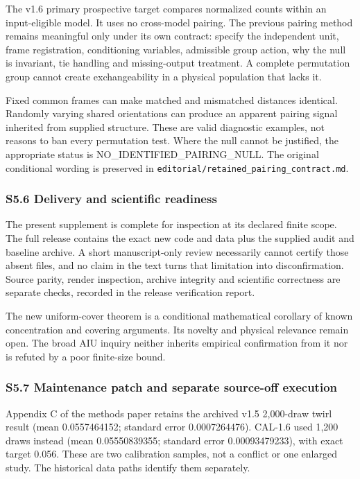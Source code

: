 \documentclass[
  10pt,
  a4paper,
]{article}
\begin{document}
The v1.6 primary prospective target compares normalized counts within an
input-eligible model. It uses no cross-model pairing. The previous
pairing method remains meaningful only under its own contract: specify
the independent unit, frame registration, conditioning variables,
admissible group action, why the null is invariant, tie handling and
missing-output treatment. A complete permutation group cannot create
exchangeability in a physical population that lacks it.

Fixed common frames can make matched and mismatched distances identical.
Randomly varying shared orientations can produce an apparent pairing
signal inherited from supplied structure. These are valid diagnostic
examples, not reasons to ban every permutation test. Where the null
cannot be justified, the appropriate status is
NO\_IDENTIFIED\_PAIRING\_NULL. The original conditional wording is
preserved in \nolinkurl{editorial/retained_pairing_contract.md}.

\subsubsection{S5.6 Delivery and scientific
readiness}\label{s5.6-delivery-and-scientific-readiness}

The present supplement is complete for inspection at its declared finite
scope. The full release contains the exact new code and data plus the
supplied audit and baseline archive. A short manuscript-only review
necessarily cannot certify those absent files, and no claim in the text
turns that limitation into disconfirmation. Source parity, render
inspection, archive integrity and scientific correctness are separate
checks, recorded in the release verification report.

The new uniform-cover theorem is a conditional mathematical corollary of
known concentration and covering arguments. Its novelty and physical
relevance remain open. The broad AIU inquiry neither inherits empirical
confirmation from it nor is refuted by a poor finite-size bound.

\subsubsection{S5.7 Maintenance patch and separate source-off
execution}\label{s5.7-maintenance-patch-and-separate-source-off-execution}

Appendix C of the methods paper retains the archived v1.5 2,000-draw
twirl result (mean 0.0557464152; standard error 0.0007264476). CAL-1.6
used 1,200 draws instead (mean 0.05550839355; standard error
0.00093479233), with exact target 0.056. These are two calibration
samples, not a conflict or one enlarged study. The historical data paths
identify them separately.
\end{document}
